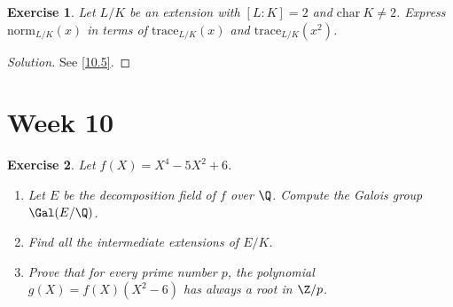 \documentclass[a4paper,10pt,reqno]{amsart}
\newtheorem{ex}{Exercise}[section]
\newenvironment{sol}
  {\renewcommand\qedsymbol{$\blacksquare$}\begin{proof}[Solution]}
  {\end{proof}}
\begin{document}
\begin{ex}
\label{9.5}
    Let $L/K$ be an extension with $[L:K] = 2$ and $\mathrm{char}\ K \neq 2$. Express $\mathrm{norm}_{L/K}(x)$ in terms of $\mathrm{trace}_{L/K}(x)$ and $\mathrm{trace}_{L/K}(x^2)$.
\end{ex}
\begin{sol}
    See \cref{10.5}.
\end{sol}


\section{Week 10}

\begin{ex}
\label{10.1}
    Let $f(X)=X^4-5X^2+6$.
    \begin{enumerate}[label=(\roman*)]
        \item Let $E$ be the decomposition field of $f$ over $\Q$.
        Compute the Galois group $\Gal(E/\Q)$.
        \item Find all the intermediate extensions of $E/K$.
        \item Prove that for every prime number $p$,
        the polynomial $g(X)=f(X)(X^2-6)$ has always 
        a root in $\Z/p$.                
    \end{enumerate}
\end{ex}
\end{document}
